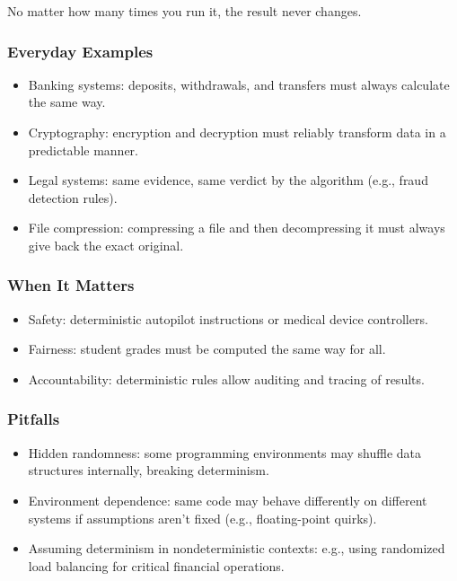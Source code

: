 \documentclass[
  letterpaper,
  DIV=11,
  numbers=noendperiod]{scrreprt}
\providecommand{\tightlist}{%
  \setlength{\itemsep}{0pt}\setlength{\parskip}{0pt}}
\begin{document}
No matter how many times you run it, the result never changes.

\subsubsection{Everyday Examples}\label{everyday-examples-27}

\begin{itemize}
\tightlist
\item
  Banking systems: deposits, withdrawals, and transfers must always
  calculate the same way.
\item
  Cryptography: encryption and decryption must reliably transform data
  in a predictable manner.
\item
  Legal systems: same evidence, same verdict by the algorithm (e.g.,
  fraud detection rules).
\item
  File compression: compressing a file and then decompressing it must
  always give back the exact original.
\end{itemize}

\subsubsection{When It Matters}\label{when-it-matters-26}

\begin{itemize}
\tightlist
\item
  Safety: deterministic autopilot instructions or medical device
  controllers.
\item
  Fairness: student grades must be computed the same way for all.
\item
  Accountability: deterministic rules allow auditing and tracing of
  results.
\end{itemize}

\subsubsection{Pitfalls}\label{pitfalls-25}

\begin{itemize}
\tightlist
\item
  Hidden randomness: some programming environments may shuffle data
  structures internally, breaking determinism.
\item
  Environment dependence: same code may behave differently on different
  systems if assumptions aren't fixed (e.g., floating-point quirks).
\item
  Assuming determinism in nondeterministic contexts: e.g., using
  randomized load balancing for critical financial operations.
\end{itemize}
\end{document}

